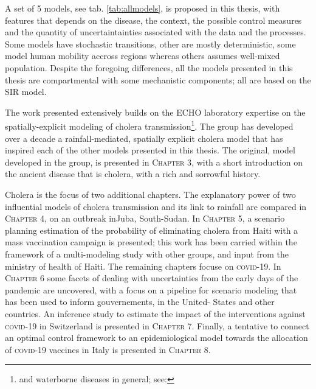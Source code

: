 A set of 5 models, see tab. \ref{tab:allmodels}, is proposed in this thesis, with features that depends on the disease, the context, the possible control measures and the quantity of uncertaintainties associated with the data and the processes. Some models have stochastic transitions, other are mostly deterministic, some model human mobility accross regions whereas others assumes well-mixed population. Despite the foregoing differences, all the models presented in this thesis are compartmental with some mechanistic components; all are based on the SIR model.

The work presented extensively builds on the ECHO laboratory expertise on the spatially-explicit modeling of cholera transmission\footnote{and waterborne diseases in general; see: }. The group has developed over a decade a rainfall-mediated, spatially explicit cholera model that has inspired each of the other models presented in this thesis. The original,  model developed in the group, is presented in \textsc{Chapter 3}, with a short introduction on the ancient disease that is cholera, with a rich and sorrowful history.

Cholera is the focus of two additional chapters. The explanatory power of two influential models of cholera transmission and its link to rainfall are compared in \textsc{Chapter 4}, on an outbreak inJuba, South-Sudan. In \textsc{Chapter 5}, a scenario planning estimation of the probability of eliminating cholera from Haiti with a mass vaccination campaign is presented; this work has been carried within the framework of a multi-modeling study with other groups, and input from the ministry of health of Haiti.
The remaining chapters focuse on \textsc{covid}-19. In \textsc{Chapter 6} some facets of dealing with uncertainties from the early days of the pandemic are uncovered, with a focus on a pipeline for scenario modeling that has been used to inform gouvernements, in the United- States and other countries. 
An inference study to estimate the impact of the interventions against \textsc{covid}-19 in Switzerland is presented in \textsc{Chapter 7}.
Finally, a tentative to connect an optimal control framework to an epidemiological model towards the allocation of \textsc{covid}-19 vaccines in Italy is presented in \textsc{Chapter 8}.

